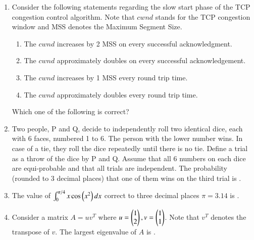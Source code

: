 \documentclass[journal,12pt,onecolumn]{IEEEtran}
\theoremstyle{remark}
\begin{document}
\begin{enumerate}
	\item Consider the following statements regarding the slow start phase of the TCP congestion control algorithm. Note that $cwnd$ stands for the TCP congestion window and MSS denotes the Maximum Segment Size.
	\begin{enumerate}[label=\brak{\roman*}]
		\item The $cwnd$ increases by 2 MSS on every successful acknowledgment.
		\item The $cwnd$ approximately doubles on every successful acknowledgement.
		\item The $cwnd$ increases by 1 MSS every round trip time.
		\item The $cwnd$ approximately doubles every round trip time.
	\end{enumerate}
	Which one of the following is correct?
	
	\hfill{}
	\begin{enumerate}
	\end{enumerate}
	\item Two people, P and Q, decide to independently roll two identical dice, each with 6 faces, numbered 1 to 6. The person with the lower number wins. In case of a tie, they roll the dice repeatedly until there is no tie. Define a trial as a throw of the dice by P and Q. Assume that all 6 numbers on each dice are equi-probable and that all trials are independent. The probability (rounded to 3 decimal places) that one of them wins on the third trial is \underline{\hspace{2cm}}.
	\hfill{}
	\item The value of $\int_{0}^{\pi/4} x \cos\left(x^2\right) dx$ correct to three decimal places  $\pi = 3.14$ is \underline{\hspace{2cm}}.\\
	
	\hfill{}
	
	\item Consider a matrix $A = uv^T$ where $u = \begin{pmatrix}1 \\ 2\end{pmatrix}, v = \begin{pmatrix}1 \\ 1\end{pmatrix}$. Note that $v^T$ denotes the transpose of $v$. The largest eigenvalue of $A$ is \underline{\hspace{2cm}}.
	\hfill{}\\
	

\end{enumerate}
\end{document}
